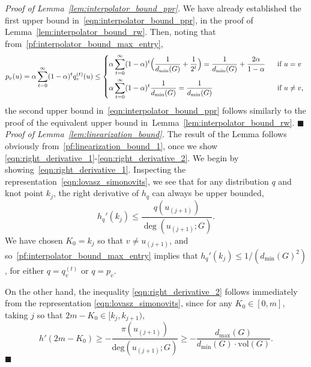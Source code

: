 \documentclass[twoside,11pt]{article}
\newcommand{\1}{\mathbf{1}}
\newcommand{\vol}{\mathrm{vol}}
\newcommand{\qed}{\hfill $\blacksquare$}
\begin{document}
\noindent \emph{Proof of Lemma~\ref{lem:interpolator_bound_ppr}.}
We have already established the first upper bound in~\eqref{eqn:interpolator_bound_ppr}, in the proof of Lemma~\ref{lem:interpolator_bound_rw}. Then, noting that from~\eqref{pf:interpolator_bound_max_entry}, 
\begin{equation}
\label{eqn:ppr_max_entry}
p_v(u) = \alpha \sum_{t = 0}^{\infty} (1 - \alpha)^t q_v^{(t)}(u) \leq
\begin{dcases*}
\alpha \sum_{t = 0}^{\infty} (1 - \alpha)^t \Bigl(\frac{1}{d_{\min}(G)} + \frac{1}{2^t}\Bigr) = \frac{1}{d_{\min}(G)} + \frac{2\alpha}{1 - \alpha}& ~~\textrm{if $u = v$} \\
\alpha \sum_{t = 0}^{\infty} (1 - \alpha)^t \frac{1}{d_{\min}(G)} = \frac{1}{d_{\min}(G)} & ~~\textrm{if $u \neq v$,}
\end{dcases*}
\end{equation}
the second upper bound in~\eqref{eqn:interpolator_bound_ppr} follows similarly to the proof of the equivalent upper bound in~Lemma~\ref{lem:interpolator_bound_rw}. \qed \\

\noindent \emph{Proof of Lemma~\ref{lem:linearization_bound}.}
The result of the Lemma follows obviously from~\eqref{pf:linearization_bound_1}, once we show \eqref{eqn:right_derivative_1}-\eqref{eqn:right_derivative_2}. We begin by showing~\eqref{eqn:right_derivative_1}. Inspecting the representation~\eqref{eqn:lovasz_simonovits}, we see that for any distribution $q$ and knot point $k_j$, the right derivative of $h_q$ can always be upper bounded,
\begin{equation*}
h_{q}'(k_j) \leq \frac{q(u_{(j + 1)})}{\deg(u_{(j + 1)};G)}.
\end{equation*}
We have chosen $K_0 = k_j$ so that $v \neq u_{(j + 1)}$, and so~\eqref{pf:interpolator_bound_max_entry} implies that $h_{q}'(k_j) \leq 1/(d_{\min}(G)^2)$, for either $q = q_v^{(t)}$ or $q = p_v$.

On the other hand, the inequality \eqref{eqn:right_derivative_2} follows immediately from the representation \eqref{eqn:lovasz_simonovits}, since for any $K_0 \in [0,m]$, taking $j$ so that $2m - K_0 \in [k_j, k_{j + 1})$, 
\begin{equation*}
h'(2m - K_0) \geq -\frac{\pi(u_{(j+1)})}{\mathrm{deg}(u_{(j + 1)};G)} \geq -\frac{d_{\max}(G)}{d_{\min}(G) \cdot \vol(G)}.
\end{equation*} \qed
\end{document}
